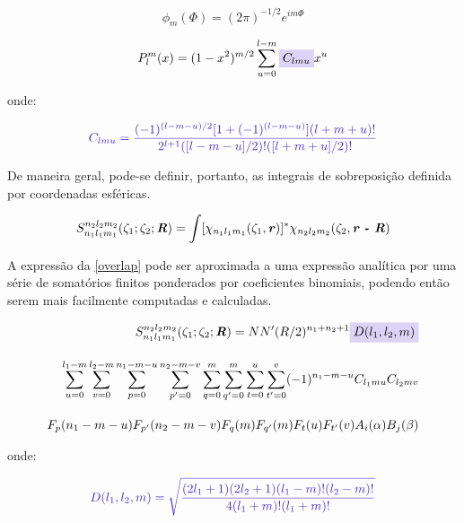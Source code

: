 \begin{equation}
    \phi_m (\Phi) = (2\pi)^{-1/2} e^{im\Phi}
\end{equation}


\begin{equation}
\label{legendre}
    P^m_l(x) = (1 - x^2)^{m/2} \sum_{u=0}^{l - m} \highlight{blue}{$C_{lmu}$} x^u
\end{equation}

\noindent onde:

\begin{equation}
    \textcolor{blue!87}{C_{lmu} = \displaystyle \frac{(-1)^{(l-m-u)/2}[1 + (-1)^{(l - m - u)}](l + m + u)!}{2^{l + 1}([l - m - u]/2)!([l + m + u]/2)!}}
\end{equation}

De maneira geral, pode-se definir, portanto, as integrais de sobreposição \autocite{Hoggan2011}
definida por coordenadas esféricas.

\begin{equation}
\label{overlap}
    S^{n_2 l_2 m_2}_{n_1 l_1 m_1} (\zeta_1; \zeta_2; \textbf{\textit{R}} ) = \int [\chi_{n_1 l_1 m_1} (\zeta_1, \textbf{\textit{r}})]^* \chi_{n_2 l_2 m_2} (\zeta_2, \textbf{\textit{r - R}})
\end{equation}

A expressão da \autoref{overlap} pode ser aproximada a uma expressão analítica por uma série de somatórios finitos ponderados por coeficientes binomiais, podendo então serem mais facilmente computadas e calculadas.

\begin{figure}[htb]
\begin{equation}
\label{analitica}
\begin{split}
    S^{n_2 l_2 m_2}_{n_1 l_1 m_1} (\zeta_1; \zeta_2; \textbf{\textit{R}} ) = N N' (R/2)^{n_1 + n_2 + 1} \highlight{blue}{$D(l_1, l_2, m)$}  \\[0.35cm] \sum_{u=0}^{l_1 - m} \sum_{v=0}^{l_2 - m} \sum_{p=0}^{n_1 - m - u} \sum_{p'=0}^{n_2 - m - v} \sum_{q=0}^{m} \sum_{q'=0}^{m} \sum_{t=0}^{u}  \sum_{t'=0}^{v} (-1)^{n_1 - m - u} C_{l_1 m u} C_{l_2 m v} \\[0.35cm] F_p (n_1 - m - u) F_{p'} (n_2 - m - v)
    F_q (m) F_{q'} (m) F_t (u) F_{t'} (v) A_i (\alpha) B_j (\beta) 
\end{split}
\end{equation}
\end{figure}

\noindent onde:

\begin{equation}
    \textcolor{blue!87}{D(l_1, l_2, m) = \displaystyle \sqrt{\frac{(2l_1 + 1)(2l_2 + 1)(l_1 - m)!(l_2 - m)!}{4(l_1 + m)!(l_1 + m)!}}}
\end{equation}

